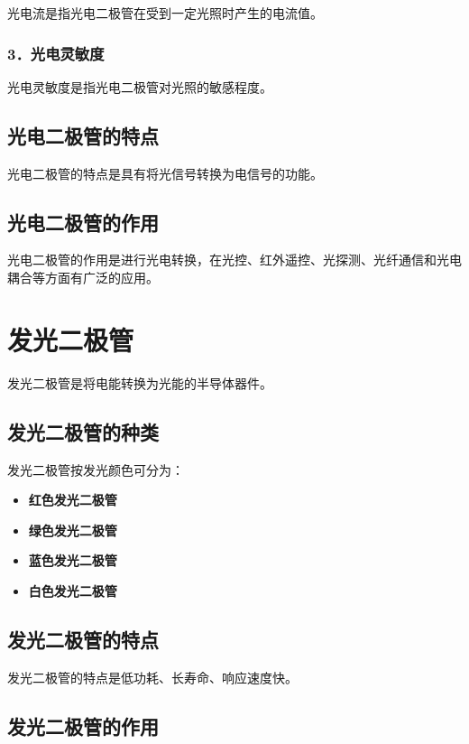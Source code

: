 \documentclass[12pt,UTF8]{ctexbook}
\begin{document}
光电流是指光电二极管在受到一定光照时产生的电流值。

\subsubsection{3．光电灵敏度}

光电灵敏度是指光电二极管对光照的敏感程度。

\subsection{光电二极管的特点}

光电二极管的特点是具有将光信号转换为电信号的功能。

\subsection{光电二极管的作用}

光电二极管的作用是进行光电转换，在光控、红外遥控、光探测、光纤通信和光电耦合等方面有广泛的应用。

\section{发光二极管}

发光二极管是将电能转换为光能的半导体器件。

\subsection{发光二极管的种类}

发光二极管按发光颜色可分为：

\begin{itemize}[leftmargin=2cm]
	\item \textbf{红色发光二极管}
	\item \textbf{绿色发光二极管}
	\item \textbf{蓝色发光二极管}
	\item \textbf{白色发光二极管}
\end{itemize}

\subsection{发光二极管的特点}

发光二极管的特点是低功耗、长寿命、响应速度快。

\subsection{发光二极管的作用}
\end{document}
